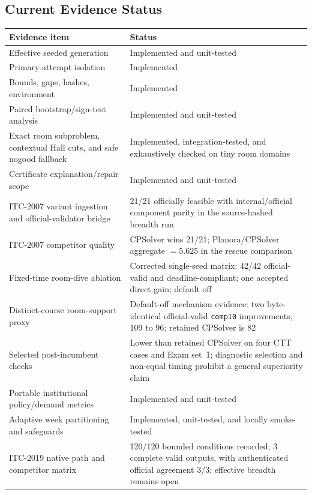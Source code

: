 \subsection{Current Evidence Status}
\begin{center}
\centering
\scriptsize
\renewcommand{\arraystretch}{0.92}
\begin{tabular}{p{}p{}}
\toprule
Evidence item & Status \\
\midrule
Effective seeded generation & Implemented and unit-tested \\
Primary-attempt isolation & Implemented \\
Bounds, gaps, hashes, environment & Implemented \\
Paired bootstrap/sign-test analysis & Implemented and unit-tested \\
Exact room subproblem, contextual Hall cuts, and safe nogood fallback & Implemented, integration-tested, and exhaustively checked on tiny room domains \\
Certificate explanation/repair scope & Implemented and unit-tested \\
ITC-2007 variant ingestion and official-validator bridge & 21/21 officially feasible with internal/official component parity in the source-hashed breadth run \\
ITC-2007 competitor quality & CPSolver wins 21/21; Planora/CPSolver aggregate $=5.625$ in the rescue comparison \\
Fixed-time room-dive ablation & Corrected single-seed matrix: 42/42 official-valid and deadline-compliant; one accepted direct gain; default off \\
Distinct-course room-support proxy & Default-off mechanism evidence: two byte-identical official-valid \texttt{comp10} improvements, 109 to 96; retained CPSolver is 82 \\
Selected post-incumbent checks & Lower than retained CPSolver on four CTT cases and Exam set~1; diagnostic selection and non-equal timing prohibit a general superiority claim \\
Portable institutional policy/demand metrics & Implemented and unit-tested \\
Adaptive week partitioning and safeguards & Implemented, unit-tested, and locally smoke-tested \\
ITC-2019 native path and competitor matrix & 120/120 bounded conditions recorded; 3 complete valid outputs, with authenticated official agreement 3/3; effective breadth remains open \\

\end{tabular}
\end{center}

